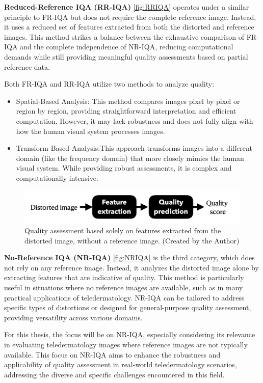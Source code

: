 \textbf{Reduced-Reference IQA (RR-IQA)} \autoref{fig:RRIQA} operates under a similar principle to FR-IQA but does not require the complete reference image. Instead, it uses a reduced set of features extracted from both the distorted and reference images. This method strikes a balance between the exhaustive comparison of FR-IQA and the complete independence of NR-IQA, reducing computational demands while still providing meaningful quality assessments based on partial reference data. \par
\vspace{\baselineskip}
Both FR-IQA and RR-IQA utilize two methods to analyze quality:
\begin{itemize}
    \item Spatial-Based Analysis: This method compares images pixel by pixel or region by region, providing straightforward interpretation and efficient computation. However, it may lack robustness and does not fully align with how the human visual system processes images.
    \item Transform-Based Analysis:This approach transforms images into a different domain (like the frequency domain) that more closely mimics the human visual system. While providing robust assessments, it is complex and computationally intensive.
\end{itemize}
\vspace{\baselineskip}
\begin{figure}[ht]
    \centering
    \includegraphics[keepaspectratio,width=15cm]{img/NRIQA.png}
    \caption{Quality assessment based solely on features extracted from the distorted image, without a reference image. (Created by the Author)}
    \label{fig:NRIQA}
\end{figure}

\textbf{No-Reference IQA (NR-IQA)} \autoref{fig:NRIQA} is the third category, which does not rely on any reference image. Instead, it analyzes the distorted image alone by extracting features that are indicative of quality. This method is particularly useful in situations where no reference images are available, such as in many practical applications of teledermatology. NR-IQA can be tailored to address specific types of distortions or designed for general-purpose quality assessment, providing versatility across various domains. \par
\vspace{\baselineskip}
For this thesis, the focus will be on NR-IQA, especially considering its relevance in evaluating teledermatology images where reference images are not typically available. This focus on NR-IQA aims to enhance the robustness and applicability of quality assessment in real-world teledermatology scenarios, addressing the diverse and specific challenges encountered in this field.

